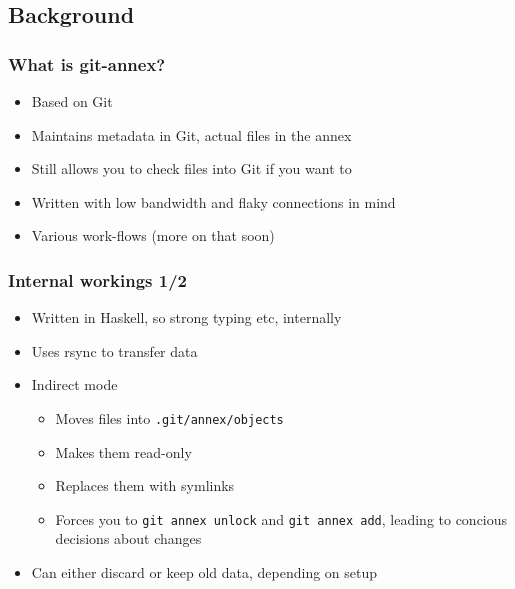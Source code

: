\documentclass[t]{beamer}
\begin{document}
\subsection{Background}

\begin{frame}
	\frametitle{What is git-annex?}
	\begin{itemize}
		\item Based on Git
		\item Maintains metadata in Git, actual files in the annex
		\item Still allows you to check files into Git if you want to
		\item Written with low bandwidth and flaky connections in mind
		\item Various work-flows (more on that soon)
	\end{itemize}
\end{frame}

\begin{frame}
	\frametitle{Internal workings 1/2}
	\begin{itemize}
		\item Written in Haskell, so strong typing etc, internally
		\item Uses rsync to transfer data
		\item Indirect mode
		\begin{itemize}
			\item Moves files into \texttt{.git/annex/objects}
			\item Makes them read-only
			\item Replaces them with symlinks
			\item Forces you to \texttt{git annex unlock} and \texttt{git annex add}, leading to concious decisions about changes
		\end{itemize}
		\item Can either discard or keep old data, depending on setup
	\end{itemize}
\end{frame}
\end{document}
